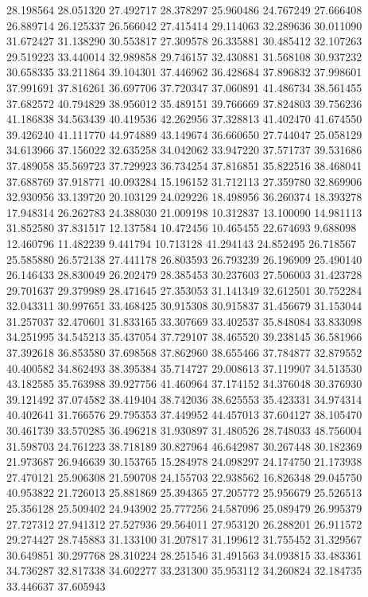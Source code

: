 28.198564
28.051320
27.492717
28.378297
25.960486
24.767249
27.666408
26.889714
26.125337
26.566042
27.415414
29.114063
32.289636
30.011090
31.672427
31.138290
30.553817
27.309578
26.335881
30.485412
32.107263
29.519223
33.440014
32.989858
29.746157
32.430881
31.568108
30.937232
30.658335
33.211864
39.104301
37.446962
36.428684
37.896832
37.998601
37.991691
37.816261
36.697706
37.720347
37.060891
41.486734
38.561455
37.682572
40.794829
38.956012
35.489151
39.766669
37.824803
39.756236
41.186838
34.563439
40.419536
42.262956
37.328813
41.402470
41.674550
39.426240
41.111770
44.974889
43.149674
36.660650
27.744047
25.058129
34.613966
37.156022
32.635258
34.042062
33.947220
37.571737
39.531686
37.489058
35.569723
37.729923
36.734254
37.816851
35.822516
38.468041
37.688769
37.918771
40.093284
15.196152
31.712113
27.359780
32.869906
32.930956
33.139720
20.103129
24.029226
18.498956
36.260374
18.393278
17.948314
26.262783
24.388030
21.009198
10.312837
13.100090
14.981113
31.852580
37.831517
12.137584
10.472456
10.465455
22.674693
9.688098
12.460796
11.482239
9.441794
10.713128
41.294143
24.852495
26.718567
25.585880
26.572138
27.441178
26.803593
26.793239
26.196909
25.490140
26.146433
28.830049
26.202479
28.385453
30.237603
27.506003
31.423728
29.701637
29.379989
28.471645
27.353053
31.141349
32.612501
30.752284
32.043311
30.997651
33.468425
30.915308
30.915837
31.456679
31.153044
31.257037
32.470601
31.833165
33.307669
33.402537
35.848084
33.833098
34.251995
34.545213
35.437054
37.729107
38.465520
39.238145
36.581966
37.392618
36.853580
37.698568
37.862960
38.655466
37.784877
32.879552
40.400582
34.862493
38.395384
35.714727
29.008613
37.119907
34.513530
43.182585
35.763988
39.927756
41.460964
37.174152
34.376048
30.376930
39.121492
37.074582
38.419404
38.742036
38.625553
35.423331
34.974314
40.402641
31.766576
29.795353
37.449952
44.457013
37.604127
38.105470
30.461739
33.570285
36.496218
31.930897
31.480526
28.748033
48.756004
31.598703
24.761223
38.718189
30.827964
46.642987
30.267448
30.182369
21.973687
26.946639
30.153765
15.284978
24.098297
24.174750
21.173938
27.470121
25.906308
21.590708
24.155703
22.938562
16.826348
29.045750
40.953822
21.726013
25.881869
25.394365
27.205772
25.956679
25.526513
25.356128
25.509402
24.943902
25.777256
24.587096
25.089479
26.995379
27.727312
27.941312
27.527936
29.564011
27.953120
26.288201
26.911572
29.274427
28.745883
31.133100
31.207817
31.199612
31.755452
31.329567
30.649851
30.297768
28.310224
28.251546
31.491563
34.093815
33.483361
34.736287
32.817338
34.602277
33.231300
35.953112
34.260824
32.184735
33.446637
37.605943

